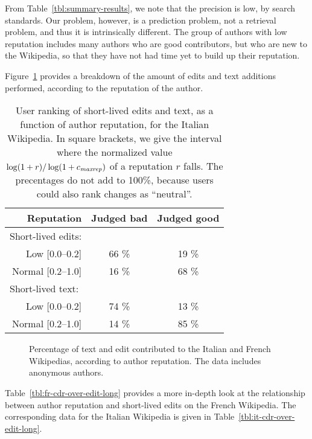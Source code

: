 From Table~\ref{tbl:summary-results}, we note that the precision is
low, by search standards.
Our problem, however, is a prediction problem, not a retrieval
problem, and thus it is intrinsically different. 
The group of authors with low reputation includes many authors who are
good contributors, but who are new to the Wikipedia, so that they have
not had time yet to build up their reputation.

Figure~\ref{fig:user-breakdown-by-rep} provides a breakdown of
the amount of edits and text additions performed, according to the
reputation of the author.

\begin{table}
\begin{center}
\begin{tabular}{|r|c|c|} \hline
\qquad \qquad Reputation & Judged bad & Judged good \\ \hline
\multicolumn{1}{|l|}{Short-lived edits: \qquad \quad} & & \\[1ex]
   Low [0.0--0.2]   &    66  \% &    19 \% \\
Normal [0.2--1.0]   &    16  \% &    68 \% \\ \hline
\multicolumn{1}{|l|}{Short-lived text: \qquad \quad} & & \\[1ex]
   Low [0.0--0.2]   &    74  \% &    13 \% \\
Normal [0.2--1.0]   &    14  \% &    85 \% \\ \hline
\end{tabular}
\end{center}
\caption{User ranking of short-lived edits and text, as a
  function of author reputation, for the Italian Wikipedia.  
  In square brackets, we give the
  interval where the normalized value $\log(1+r) / \log (1 +
  {c_{{\text{\textit{maxrep}}}}})$ of a reputation $r$ falls.  The precentages do not
  add to 100\%, because users could also rank changes as ``neutral''.} 
\label{tbl:human}
\end{table}

\begin{figure}

\caption{Percentage of text and edit contributed to the
  Italian and French Wikipedias, according to author reputation. 
  The data includes anonymous authors.}
\label{fig:user-breakdown-by-rep}
\end{figure}


\iflong 

Table~\ref{tbl:fr-cdr-over-edit-long} provides a more in-depth look at
the relationship between author reputation and short-lived edits on the
French Wikipedia. 
The corresponding data for the Italian Wikipedia is given in
Table~\ref{tbl:it-cdr-over-edit-long}.


